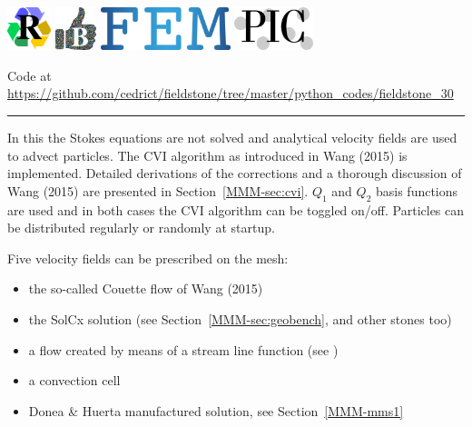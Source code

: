 \includegraphics[height=1.25cm]{images/pictograms/replication}
\includegraphics[height=1.25cm]{images/pictograms/benchmark}
\includegraphics[height=1.25cm]{images/pictograms/FEM}
\includegraphics[height=1.25cm]{images/pictograms/pic}




\begin{center}
\inpython
{\small Code at \url{https://github.com/cedrict/fieldstone/tree/master/python_codes/fieldstone_30}}
\end{center}

\par\noindent\rule{\textwidth}{0.4pt}

In this \stone the Stokes equations are not solved and analytical 
velocity fields are used to advect particles. The CVI algorithm 
as introduced in Wang \etal (2015) \cite{waav15} is implemented.
Detailed derivations of the corrections and a thorough discussion 
of Wang \etal (2015) are presented in Section~\ref{MMM-sec:cvi}.
$Q_1$ and $Q_2$ basis functions are used and in both cases the CVI algorithm can be toggled on/off. 
Particles can be distributed regularly or randomly at startup.

Five velocity fields can be prescribed on the mesh:
\begin{itemize}
\item the so-called Couette flow of Wang \etal (2015) \cite{waav15} 
\item the SolCx solution (see Section~\ref{MMM-sec:geobench}, and  other stones too)
\item a flow created by means of a stream line function (see )
\item a convection cell 
\item Donea \& Huerta manufactured solution, see Section~\ref{MMM-mms1}
\end{itemize}


